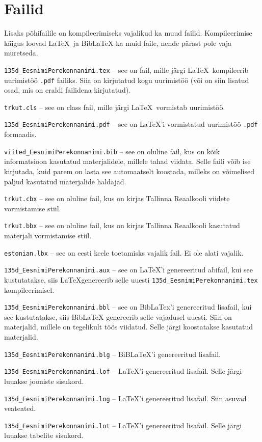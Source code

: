 \documentclass{trkut}%
\begin{document}
\section{Failid}
Lisaks põhifailile on kompileerimiseks vajalikud ka muud failid. Kompileerimise käigus loovad \LaTeX\ ja BibLaTeX ka muid faile, nende pärast pole vaja muretseda.

\verb!135d_EesnimiPerekonnanimi.tex! -- see  on fail, mille järgi \LaTeX\ kompileerib uurimistöö \verb!.pdf! failiks. Siia on kirjutatud kogu uurimistöö (või on siin lisatud osad, mis on eraldi failidena kirjutatud).

\verb!trkut.cls! -- see  on class fail, mille järgi \LaTeX\ vormistab uurimistöö.

\verb!135d_EesnimiPerekonnanimi.pdf! -- see on  \LaTeX'i  vormistatud uurimistöö \verb!.pdf! formaadis.

\verb!viited_EesnimiPerekonnanimi.bib! -- see on oluline fail, kus on kõik informatsioon kasutatud materjalidele, millele tahad viidata. Selle faili võib ise kirjutada, kuid parem on lasta see automaatselt koostada, milleks on võimelised paljud kasutatud materjalide haldajad.

\verb!trkut.cbx! -- see on oluline fail, kus on kirjas Tallinna Reaalkooli viidete vormistamise stiil.

\verb!trkut.bbx! -- see on oluline fail, kus on kirjas Tallinna Reaalkooli kasutatud materjali vormistamise stiil.

\verb!estonian.lbx! -- see on eesti keele toetamisks vajalik fail. Ei ole alati vajalik.

\verb!135d_EesnimiPerekonnanimi.aux! -- see on \LaTeX'i genereeritud abifail, kui see kustutatakse, siis \LaTeX genereerib selle uuesti \verb!135d_EesnimiPerekonnanimi.tex! kompileerimisel.

\verb!135d_EesnimiPerekonnanimi.bbl! -- see on BibLaTex'i genereeritud lisafail, kui see kustutatakse, siis BibLaTeX genereerib selle vajadusel uuesti. Siin on materjalid, millele on tegelikult töös viidatud. Selle järgi koostatakse kasutatud materjalid.

\verb!135d_EesnimiPerekonnanimi.blg! -- BiBLaTeX'i genereeritud lisafail.

\verb!135d_EesnimiPerekonnanimi.lof! -- \LaTeX'i genereeritud lisafail. Selle järgi luuakse jooniste sisukord.

\verb!135d_EesnimiPerekonnanimi.log! -- \LaTeX'i genereeritud lisafail. Siin asuvad veateated.

\verb!135d_EesnimiPerekonnanimi.lot! -- \LaTeX'i genereeritud lisafail. Selle järgi luuakse tabelite sisukord.
\end{document}

